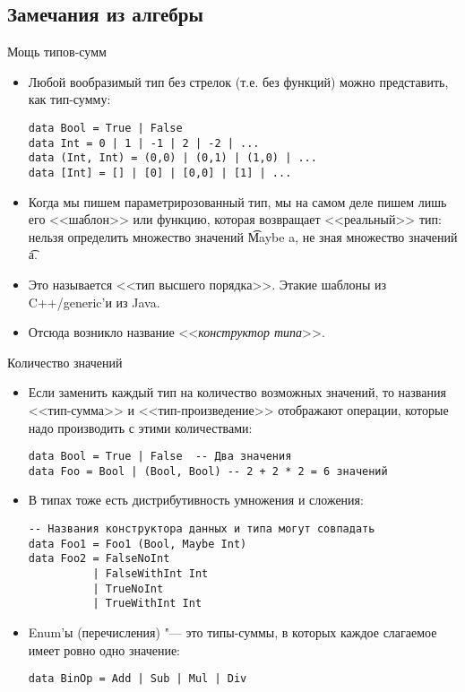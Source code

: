 \subsection{Замечания из алгебры}
\begin{frame}
\end{frame}

\begin{frame}[fragile]{Мощь типов-сумм}
	\begin{itemize}
		\item Любой вообразимый тип без стрелок (т.е. без функций) можно представить, как тип-сумму:
\begin{verbatim}
data Bool = True | False
data Int = 0 | 1 | -1 | 2 | -2 | ...
data (Int, Int) = (0,0) | (0,1) | (1,0) | ...
data [Int] = [] | [0] | [0,0] | [1] | ...
\end{verbatim}
		\item Когда мы пишем параметрирозованный тип, мы на самом деле пишем лишь его <<шаблон>> или функцию, которая возвращает <<реальный>> тип:
			нельзя определить множество значений \t{Maybe a}, не зная множество значений \t{a}.
		\item
			Это называется <<тип высшего порядка>>.
			Этакие шаблоны из C++/generic'и из Java.
		\item
			Отсюда возникло название <<\textit{конструктор типа}>>.
	\end{itemize}
\end{frame}

\begin{frame}[fragile]{Количество значений}
	\begin{itemize}
		\item
			Если заменить каждый тип на количество возможных значений, то названия <<тип-сумма>> и <<тип-произведение>> отображают
			операции, которые надо производить с этими количествами:
\begin{verbatim}
data Bool = True | False  -- Два значения
data Foo = Bool | (Bool, Bool) -- 2 + 2 * 2 = 6 значений
\end{verbatim}
		\item
			В типах тоже есть дистрибутивность умножения и сложения:
\begin{verbatim}
-- Названия конструктора данных и типа могут совпадать
data Foo1 = Foo1 (Bool, Maybe Int)
data Foo2 = FalseNoInt
          | FalseWithInt Int
          | TrueNoInt
          | TrueWithInt Int
\end{verbatim}
		\item Enum'ы (перечисления) "--- это типы-суммы, в которых каждое слагаемое имеет ровно одно значение:
\begin{verbatim}
data BinOp = Add | Sub | Mul | Div
\end{verbatim}
	\end{itemize}
\end{frame}
